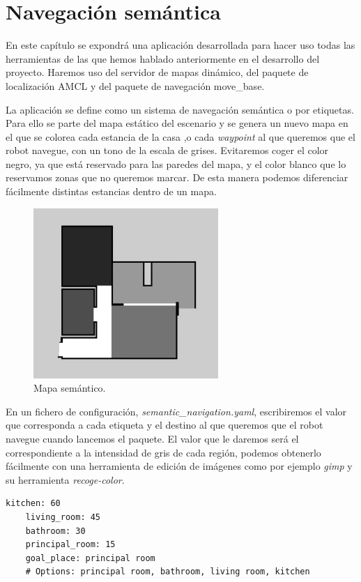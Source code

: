 \chapter{Navegación semántica}
\label{cap:navegacionsemantica}
En este capítulo se expondrá una aplicación desarrollada para hacer uso todas las herramientas de las que hemos hablado anteriormente en el desarrollo del proyecto. Haremos uso del servidor de mapas dinámico, del paquete de localización AMCL y del paquete de navegación 
move\_base.

La aplicación se define como un sistema de navegación semántica o por etiquetas. Para ello se parte del mapa estático del escenario y se genera un nuevo mapa en el que se colorea cada estancia de la casa ,o cada \textit{waypoint} al que queremos que el robot navegue, con un tono de la escala de grises. Evitaremos coger el color negro, ya que está reservado para las paredes del mapa, y el color blanco que lo reservamos zonas que no queremos marcar. De esta manera podemos diferenciar fácilmente distintas estancias dentro de un mapa. 

\begin{figure} [hbtp]
  \begin{center}
    \includegraphics[width=7cm]{img/cap6/semanticmap}
  \end{center}
  \caption{Mapa semántico.}
  \label{fig:semanticmap}
\end{figure}

En un fichero de configuración, \textit{semantic\_navigation.yaml}, escribiremos el valor que corresponda a cada etiqueta y el destino al que queremos que el robot navegue cuando lancemos el paquete. El valor que le daremos será el correspondiente a la intensidad de gris de cada región, podemos obtenerlo fácilmente con una herramienta de edición de imágenes como por ejemplo \textit{gimp} y su herramienta \textit{recoge-color}.
\begin{lstlisting}[caption=Fichero de configuración de la navegación semántica, label={lst:semanticconfig}]
	kitchen: 60
	living_room: 45
	bathroom: 30
	principal_room: 15
	goal_place: principal room 
	# Options: principal room, bathroom, living room, kitchen
\end{lstlisting}

